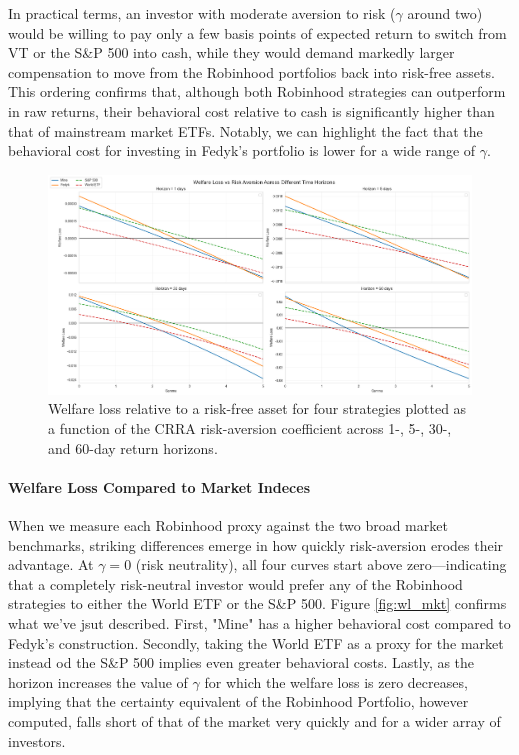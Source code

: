 In practical terms, an investor with moderate aversion to risk ($\gamma$ around two) would be willing to pay only a few basis points of expected return to switch from VT or the S\&P 500 into cash, while they would demand markedly larger compensation to move from the Robinhood portfolios back into risk-free assets. 
This ordering confirms that, although both Robinhood strategies can outperform in raw returns, their behavioral cost relative to cash is significantly higher than that of mainstream market ETFs.
Notably, we can highlight the fact that the behavioral cost for investing in Fedyk's portfolio is lower for a wide range of $\gamma$.
\begin{figure}[H]
    \centering
    \includegraphics[width=\linewidth]{../images/wl_rf.png}
\caption{Welfare loss relative to a risk-free asset for four strategies plotted as a function of the CRRA risk-aversion coefficient across 1-, 5-, 30-, and 60-day return horizons.}
\end{figure}    



\paragraph{Welfare Loss Compared to Market Indeces}
When we measure each Robinhood proxy against the two broad market benchmarks, striking differences emerge in how quickly risk-aversion erodes their advantage.  
At $\gamma=0$ (risk neutrality), all four curves start above zero—indicating that a completely risk-neutral investor would prefer any of the Robinhood strategies to either the World ETF or the S\&P 500.  
Figure \ref{fig:wl_mkt} confirms what we've jsut described.
First, "Mine" has a higher behavioral cost compared to Fedyk's construction.
Secondly, taking the World ETF as a proxy for the market instead od the S\&P 500 implies even greater behavioral costs.
Lastly, as the horizon increases the value of $\gamma$ for which the welfare loss is zero decreases, implying that the certainty equivalent of the Robinhood Portfolio, however computed, falls short of that of the market very quickly and for a wider array of investors.    

